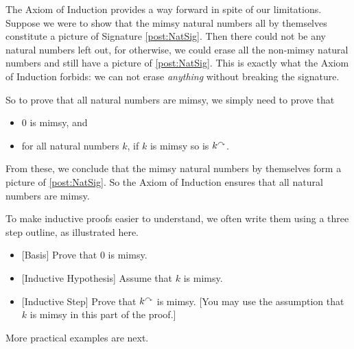 The Axiom of Induction provides a way forward in spite of our
limitations.  Suppose we were to show that the mimsy natural numbers
all by themselves constitute a picture of Signature
\ref{post:NatSig}.  Then there could not be any natural numbers
left out, for otherwise, we could erase all the non-mimsy natural
numbers and still have a picture of \ref{post:NatSig}. This
is exactly what the Axiom of Induction forbids: we can not erase
\emph{anything} without breaking the signature.

So to prove that all natural numbers are mimsy, we simply need to
prove that
\begin{itemize}
\item $0$ is mimsy, and
\item for all natural numbers $k$, if $k$ is mimsy so is $k^\curvearrowright$.
\end{itemize}
From these, we conclude that the mimsy natural numbers by themselves form a picture of \ref{post:NatSig}. So the Axiom of Induction ensures that all natural numbers
are mimsy.


To make inductive proofs easier to understand, we often write them
using a three step outline, as illustrated here.
\begin{itemize}
\item{}[Basis] Prove that $0$ is mimsy.
\item{}[Inductive Hypothesis] Assume that $k$ is mimsy.
\item{}[Inductive Step] Prove that $k^\curvearrowright$ is mimsy. [You may use the
  assumption that $k$ is mimsy in this part of the proof.]
\end{itemize}

More practical examples are next.

